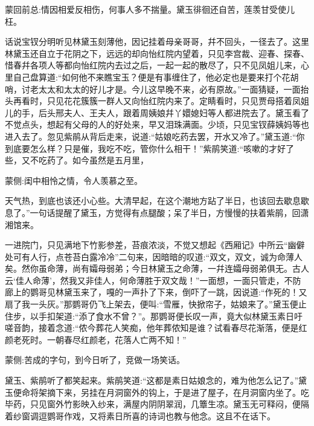 
\begin{parag}
    \begin{note}蒙回前总:情因相爱反相伤，何事人多不揣量。黛玉徘徊还自苦，莲羡甘受使儿枉。\end{note}
\end{parag}


\begin{parag}
    话说宝钗分明听见林黛玉刻薄他，因记挂着母亲哥哥，幷不回头，一径去了。这里林黛玉还自立于花阴之下，远远的却向怡红院内望着，只见李宫裁、迎春、探春、惜春幷各项人等都向怡红院内去过之后，一起一起的散尽了，只不见凤姐儿来，心里自己盘算道:“如何他不来瞧宝玉？便是有事缠住了，他必定也是要来打个花胡哨，讨老太太和太太的好儿才是。今儿这早晚不来，必有原故。”一面猜疑，一面抬头再看时，只见花花簇簇一群人又向怡红院内来了。定睛看时，只见贾母搭着凤姐儿的手，后头邢夫人、王夫人，跟着周姨娘幷丫嬛媳妇等人都进院去了。黛玉看了不觉点头，想起有父母的人的好处来，早又泪珠满面。少顷，只见宝钗薛姨妈等也进入去了。忽见紫鹃从背后走来，说道:“姑娘吃药去罢，开水又冷了。”黛玉道:“你到底要怎么样？只是催，我吃不吃，管你什么相干！”紫鹃笑道:“咳嗽的才好了些，又不吃药了。如今虽然是五月里，\begin{note}蒙侧:闺中相怜之情，令人羡慕之至。\end{note}天气热，到底也该还小心些。大清早起，在这个潮地方跕了半日，也该回去歇息歇息了。”一句话提醒了黛玉，方觉得有点腿酸；呆了半日，方慢慢的扶着紫鹃，回潇湘馆来。
\end{parag}


\begin{parag}
    一进院门，只见满地下竹影参差，苔痕浓淡，不觉又想起《西厢记》中所云“幽僻处可有人行，点苍苔白露冷冷”二句来，因暗暗的叹道:“双文，双文，诚为命薄人矣。然你虽命薄，尚有孀母弱弟；今日林黛玉之命薄，一幷连孀母弱弟俱无。古人云‘佳人命薄’，然我又非佳人，何命薄胜于双文哉！”一面想，一面只管走，不防廊上的鹦哥见林黛玉来了，嘎的一声扑了下来，倒吓了一跳，因说道:“作死的！又扇了我一头灰。”那鹦哥仍飞上架去，便叫:“雪雁，快掀帘子，姑娘来了。”黛玉便止住步，以手扣架道:“添了食水不曾？”。那鹦哥便长叹一声，竟大似林黛玉素日吁嗟音韵，接着念道:“侬今葬花人笑痴，他年葬侬知是谁？试看春尽花渐落，便是红颜老死时。一朝春尽红颜老，花落人亡两不知！”\begin{note}蒙侧:苦成的字句，到今日听了，竞做一场笑话。\end{note}黛玉、紫鹃听了都笑起来。紫鹃笑道:“这都是素日姑娘念的，难为他怎么记了。”黛玉便命将架摘下来，另挂在月洞窗外的钩上，于是进了屋子，在月洞窗内坐了。吃毕药，只见窗外竹影映入纱来，满屋内阴阴翠润，几簟生凉。黛玉无可释闷，便隔着纱窗调逗鹦哥作戏，又将素日所喜的诗词也教与他念。这且不在话下。
\end{parag}


